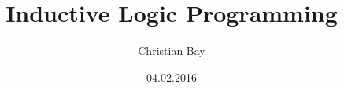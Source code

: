\documentclass[12pt]{beamer}
\title[Machine Learning -- ILP]{Inductive Logic Programming} %
\author{Christian Bay} %
\institute[FAU] %
{
	FAU Erlangen-Nürnberg \\ %
	\medskip
	\textit{christian.bay@fau.de} %
}
\date{04.02.2016} %
\begin{document}
\begin{frame}
	\titlepage
\end{frame}
\tableofcontents






\end{document}
